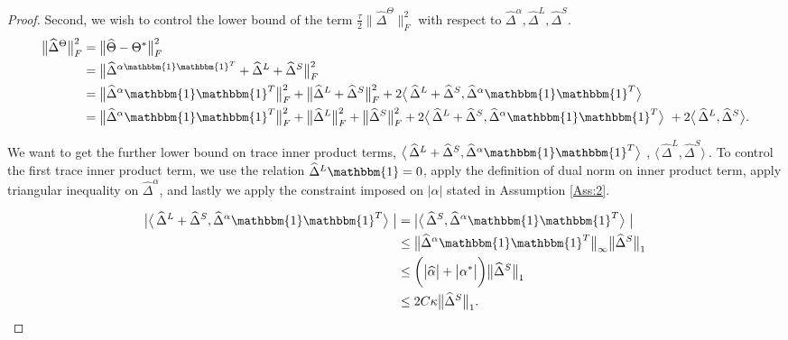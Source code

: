 \documentclass[AMS,STIX1COL]{WileyNJD-v2}
\begin{document}
{\begin{proof}
Second, we wish to control the lower bound of the term  $\frac{\tau}{2}\big\|\widehat{\Delta}^{\Theta}\big\|_{F}^{2}$ with respect to $\widehat{\Delta}^{\alpha},\widehat{\Delta}^{L},\widehat{\Delta}^{S}$.
\begin{align}
\big\|\widehat{\Delta}^{\Theta}\big\|_{F}^{2}  \nonumber
&= \big\|\widehat{\Theta}-\Theta^{*} \big\|_{F}^{2} \\ \nonumber
&= \big\|\widehat\Delta^{\alpha\mathbbm{1}\mathbbm{1}^T} + \widehat\Delta^{L} + \widehat\Delta^{S}\big\|_{F}^{2} \\ \nonumber
&= \big\|\widehat{\Delta}^{\alpha}\mathbbm{1}\mathbbm{1}^T\big\|_{F}^{2} + \big\|\widehat{\Delta}^{L}+\widehat{\Delta}^{S}\big\|_{F}^{2} +
2 \big\langle\, \widehat\Delta^{L} + \widehat\Delta^{S} ,\widehat{\Delta}^{\alpha}\mathbbm{1}\mathbbm{1}^T \big\rangle\ \\
&=  \big\|\widehat{\Delta}^{\alpha}\mathbbm{1}\mathbbm{1}^T\big\|_{F}^{2} + \big\|\widehat{\Delta}^{L}\big\|_{F}^{2} + \big\|\widehat{\Delta}^{S}\big\|_{F}^{2} +
2 \big\langle\, \widehat\Delta^{L} + \widehat\Delta^{S} ,\widehat{\Delta}^{\alpha}\mathbbm{1}\mathbbm{1}^T \big\rangle\ +
2 \big\langle\, \widehat\Delta^{L}, \widehat\Delta^{S} \big\rangle.\label{eq:12}
\end{align}

We want to get the further lower bound on trace inner product terms,
$ \big\langle\, \widehat\Delta^{L} + \widehat\Delta^{S} ,\widehat{\Delta}^{\alpha}\mathbbm{1}\mathbbm{1}^T \big\rangle\ $, $ \big\langle\, \widehat\Delta^{L}, \widehat\Delta^{S} \big\rangle\ $. To control the first trace inner product term, we use the relation $\widehat{\Delta}^{L}\mathbbm{1}=0$, apply the definition of dual norm on inner product term, apply triangular inequality on $\widehat{\Delta}^\alpha$, and lastly we apply the constraint imposed on $|\alpha|$ stated in Assumption \ref{Ass:2}.

\begin{align}
    \big| \big\langle\, \widehat\Delta^{L} + \widehat\Delta^{S} ,\widehat{\Delta}^{\alpha}\mathbbm{1}\mathbbm{1}^T\big\rangle\ \big| \nonumber
    &= \big| \big\langle\,\widehat\Delta^{S},\widehat{\Delta}^{\alpha}\mathbbm{1}\mathbbm{1}^T\big\rangle\ \big| \\ \nonumber
    &\leq \big\|\widehat{\Delta}^{\alpha}\mathbbm{1}\mathbbm{1}^T \big\|_{\infty} \big\|\widehat{\Delta}^{S}\big\|_1 \\ \nonumber
    &\leq \bigg(\big|\widehat{\alpha}\big|+\big|\alpha^{*}\big|\bigg)\big\|\widehat{\Delta}^{S}\big\|_1\\
    &\leq 2C\kappa\big\|\widehat{\Delta}^{S}\big\|_1.  \label{eq:13}
\end{align}


\end{proof}}
\end{document}
